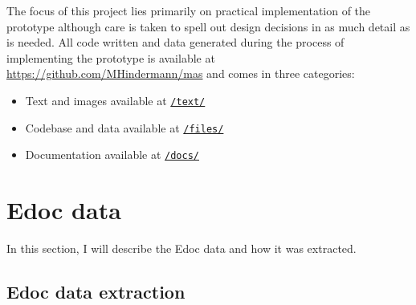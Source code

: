 The focus of this project lies primarily on practical implementation of
the prototype although care is taken to spell out design decisions in as
much detail as is needed. All code written and data generated during the
process of implementing the prototype is available at
\url{https://github.com/MHindermann/mas} and comes in three categories:

\begin{itemize}
\tightlist
\item
  Text and images available at
  \href{https://github.com/MHindermann/mas/tree/main/text}{\texttt{/text/}}
\item
  Codebase and data available at
  \href{https://github.com/MHindermann/mas/tree/main/files}{\texttt{/files/}}
\item
  Documentation available at
  \href{https://github.com/MHindermann/mas/tree/main/docs}{\texttt{/docs/}}
\end{itemize}

\hypertarget{edoc-data}{%
\section{Edoc data}\label{edoc-data}}

In this section, I will describe the Edoc data and how it was extracted.

\hypertarget{edoc-data-extraction}{%
\subsection{Edoc data extraction}\label{edoc-data-extraction}}

